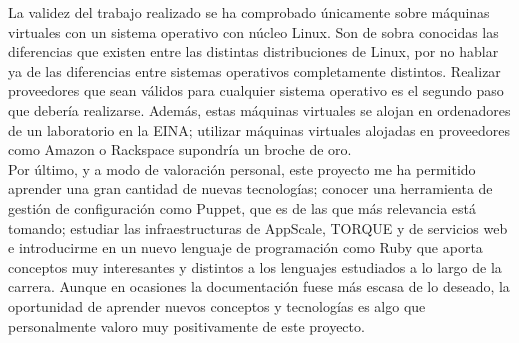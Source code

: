 La validez del trabajo realizado se ha comprobado únicamente sobre máquinas virtuales con un sistema operativo con núcleo Linux. Son de sobra conocidas las diferencias que existen entre las distintas distribuciones de Linux, por no hablar ya de las diferencias entre sistemas operativos completamente distintos. Realizar proveedores que sean válidos para cualquier sistema operativo es el segundo paso que debería realizarse. Además, estas máquinas virtuales se alojan en ordenadores de un laboratorio en la EINA; utilizar máquinas virtuales alojadas en proveedores como Amazon o Rackspace supondría un broche de oro. \\

Por último, y a modo de valoración personal, este proyecto me ha permitido aprender una gran cantidad de nuevas tecnologías; conocer una herramienta de gestión de configuración como Puppet, que es de las que más relevancia está tomando; estudiar las infraestructuras de AppScale, TORQUE y de servicios web e introducirme en un nuevo lenguaje de programación como Ruby que aporta conceptos muy interesantes y distintos a los lenguajes estudiados a lo largo de la carrera. Aunque en ocasiones la documentación fuese más escasa de lo deseado, la oportunidad de aprender nuevos conceptos y tecnologías es algo que personalmente valoro muy positivamente de este proyecto.
